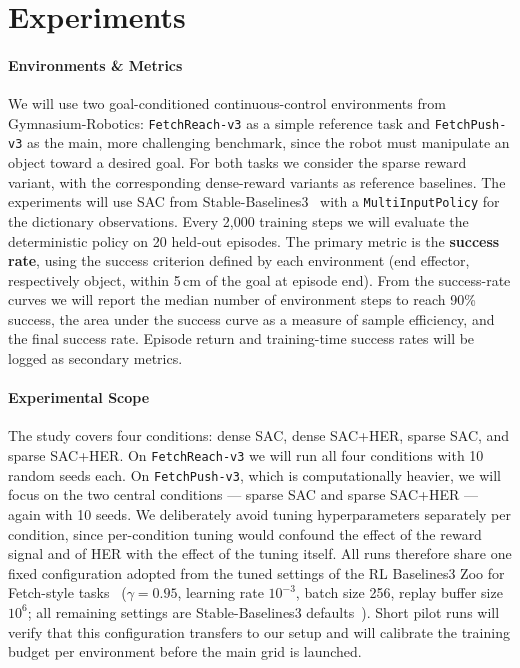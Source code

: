 \documentclass{article}
\begin{document}
\section{Experiments}
\paragraph{Environments \& Metrics}
We will use two goal-conditioned continuous-control environments from
Gymnasium-Robotics: \texttt{FetchReach-v3} as a simple reference task and
\texttt{FetchPush-v3} as the main, more challenging benchmark, since the
robot must manipulate an object toward a desired goal. For both tasks we
consider the sparse reward variant, with the corresponding dense-reward
variants as reference baselines. The experiments will use SAC from
Stable-Baselines3~\cite{raffin21sb3} with a \texttt{MultiInputPolicy} for the
dictionary observations. Every 2{,}000 training steps we will evaluate the
deterministic policy on 20 held-out episodes. The primary metric is the
\textbf{success rate}, using the success criterion defined by each
environment (end effector, respectively object, within 5\,cm of the goal at
episode end). From the success-rate curves we will report the median number
of environment steps to reach 90\% success, the area under the success curve
as a measure of sample efficiency, and the final success rate. Episode
return and training-time success rates will be logged as secondary metrics.

\paragraph{Experimental Scope}
The study covers four conditions: dense SAC, dense SAC+HER, sparse SAC, and
sparse SAC+HER. On \texttt{FetchReach-v3} we will run all four conditions
with 10 random seeds each. On \texttt{FetchPush-v3}, which is computationally
heavier, we will focus on the two central conditions --- sparse SAC and
sparse SAC+HER --- again with 10 seeds. We deliberately avoid tuning
hyperparameters separately per condition, since per-condition tuning would
confound the effect of the reward signal and of HER with the effect of the
tuning itself. All runs therefore share one fixed configuration adopted from
the tuned settings of the RL Baselines3 Zoo for Fetch-style
tasks~\cite{raffin20zoo} ($\gamma = 0.95$, learning rate $10^{-3}$, batch
size 256, replay buffer size $10^6$; all remaining settings are
Stable-Baselines3 defaults~\cite{raffin21sb3}). Short pilot runs will verify
that this configuration transfers to our setup and will calibrate the
training budget per environment before the main grid is launched.
\end{document}
